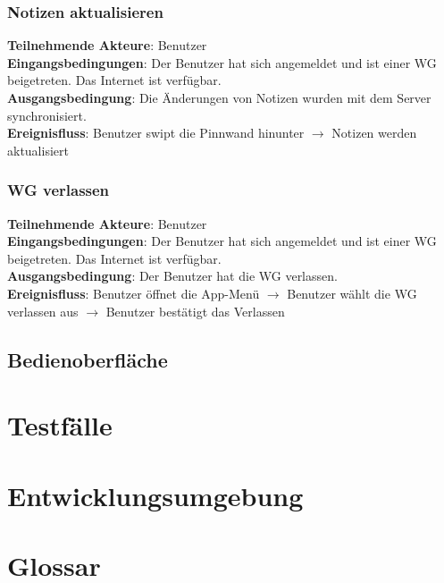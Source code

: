 \documentclass[a4paper]{scrreprt}
\begin{document}
		\subsection{Notizen aktualisieren}
		\textbf{Teilnehmende Akteure}: Benutzer \\
		\textbf{Eingangsbedingungen}: Der Benutzer hat sich angemeldet und ist einer WG beigetreten. Das Internet ist verfügbar. \\
		\textbf{Ausgangsbedingung}: Die Änderungen von Notizen wurden mit dem Server synchronisiert. \\
		\textbf{Ereignisfluss}: Benutzer swipt die Pinnwand hinunter $\rightarrow$ Notizen werden aktualisiert
		
		\subsection{WG verlassen}
		\textbf{Teilnehmende Akteure}: Benutzer \\
		\textbf{Eingangsbedingungen}: Der Benutzer hat sich angemeldet und ist einer WG beigetreten. Das Internet ist verfügbar. \\
		\textbf{Ausgangsbedingung}: Der Benutzer hat die WG verlassen. \\
		\textbf{Ereignisfluss}: Benutzer öffnet die App-Menü $\rightarrow$ Benutzer wählt die WG verlassen aus $\rightarrow$ Benutzer bestätigt das Verlassen
        	
        	\newpage
        \section{Bedienoberfläche}

    \chapter{Testfälle}
    
    \chapter{Entwicklungsumgebung}

	\chapter{Glossar}
	
    \glsaddall
    \printglossaries

    \listoffigures
\end{document}
